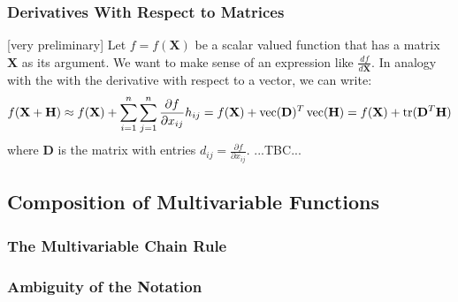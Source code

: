 \subsubsection{Derivatives With Respect to Matrices}  [very preliminary]
Let $f = f(\mathbf{X})$ be a scalar valued function that has a matrix $\mathbf{X}$ as its argument. We want to make sense of an expression like $\frac{d f}{d \mathbf{X}}$. In analogy with the with the derivative with respect to a vector, we can write:
\begin{equation}
f(\mathbf{X + H}) \approx 
f(\mathbf{X}) + \sum_{i=1}^{n} \sum_{j=1}^{n} \frac{\partial f}{\partial x_{ij}} h_{ij} =
f(\mathbf{X}) + \operatorname{vec}(\mathbf{D})^T \operatorname{vec}(\mathbf{H}) =
f(\mathbf{X}) + \operatorname{tr}(\mathbf{D}^T \mathbf{H})
\end{equation}
where $\mathbf{D}$ is the matrix with entries $d_{ij} = \frac{\partial f}{\partial x_{ij}}$. ...TBC...





\subsection{Composition of Multivariable Functions}

\subsubsection{The Multivariable Chain Rule}

\subsubsection{Ambiguity of the Notation}













